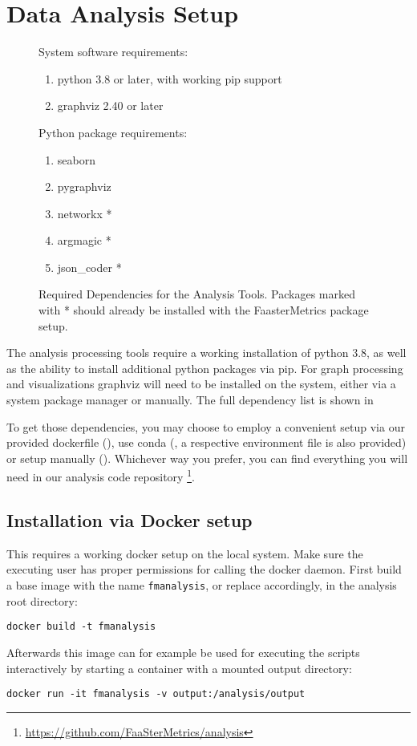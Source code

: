 \documentclass[../main.tex]{subfiles}
\begin{document}
\section{Data Analysis Setup}

\begin{figure}
  System software requirements:
  \begin{enumerate}
    \item python 3.8 or later, with working pip support
    \item graphviz 2.40 or later
  \end{enumerate}
  Python package requirements:
  \begin{enumerate}
    \item seaborn
    \item pygraphviz
    \item networkx *
    \item argmagic *
    \item json\_coder *
  \end{enumerate}
  \caption[Required Dependencies for the Analysis Tools]%
  {Required Dependencies for the Analysis Tools. 
  Packages marked with * should already be installed with the FaasterMetrics package setup.}%
  \label{fig:analysisRequiredSetupTools}
\end{figure}


The analysis processing tools require a working installation of python 3.8, 
as well as the ability to install additional python packages via pip. 
For graph processing and visualizations graphviz will need to be installed on the system, 
either via a system package manager or manually. 
The full dependency list is shown in 

To get those dependencies, you may choose to employ a convenient setup via our provided dockerfile (),
use conda (, a respective environment file is also provided) or setup manually ().
Whichever way you prefer, you can find everything you will need in our analysis code repository%
\footnote{\url{https://github.com/FaaSterMetrics/analysis}}.

\subsection{Installation via Docker setup}%
\label{sub:analysisDockerSetup}

This requires a working docker setup on the local system. 
Make sure the executing user has proper permissions for calling the docker daemon.
First build a base image with the name \texttt{fmanalysis}, or replace accordingly, in the analysis root directory:
\begin{tcolorbox}
  \texttt{docker build -t fmanalysis}
\end{tcolorbox}\noindent
Afterwards this image can for example be used for executing the scripts interactively by starting a container with a mounted output directory:
\begin{tcolorbox}
  \texttt{docker run -it fmanalysis -v output:/analysis/output}
\end{tcolorbox}
\end{document}
